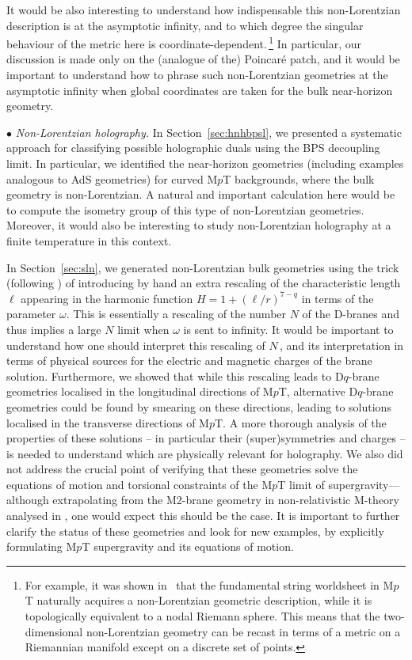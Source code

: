 \documentclass[11pt]{article}
\renewcommand{\emph}[1]{\textit{#1}}
\begin{document}
It would be also interesting to understand how indispensable this non-Lorentzian description is at the asymptotic infinity, and to which degree the singular behaviour of the metric here is coordinate-dependent.\,\footnote{For example, it was shown in~\cite{Gomis:2023eav} that the fundamental string worldsheet in M$p$T naturally acquires a non-Lorentzian geometric description, while it is topologically equivalent to a nodal Riemann sphere. This means that the two-dimensional non-Lorentzian geometry can be recast in terms of a metric on a Riemannian manifold except on a discrete set of points.} In particular, our discussion is made only on the (analogue of the) Poincar\'{e} patch, and it would be important to understand how to phrase such non-Lorentzian geometries at the asymptotic infinity when global coordinates are taken for the bulk near-horizon geometry.  


\vspace{3mm}
\noindent $\bullet$ 
\emph{Non-Lorentzian holography.} 
In Section~\ref{sec:hnhbpsl}, we presented a systematic approach for classifying possible holographic duals using the BPS decoupling limit. In particular, we identified the near-horizon geometries (including examples analogous to AdS geometries) for curved M$p$T backgrounds, where the bulk geometry is non-Lorentzian. A natural and important calculation here would be to compute the isometry group of this type of non-Lorentzian geometries. 
Moreover, it would also be interesting to study non-Lorentzian holography at a finite temperature in this context.  

In Section~\ref{sec:sln}, we generated non-Lorentzian bulk geometries using the trick (following \cite{Avila:2023aey,Lambert:2024uue,Lambert:2024yjk,Fontanella:2024rvn}) of introducing by hand an extra rescaling of the characteristic length $\ell$ appearing in the harmonic function $H=1+(\ell/r)^{7-q}$ in terms of the parameter $\omega$.
This is essentially a rescaling of the number $N$ of the D-branes and thus implies a large $N$ limit when $\omega$ is sent to infinity. It would be important to understand how one should interpret this rescaling of $N$\,, and its interpretation in terms of physical sources for the electric and magnetic charges of the brane solution. 
Furthermore, we showed that while this rescaling leads to D$q$-brane geometries localised in the longitudinal directions of M$p$T, alternative D$q$-brane geometries could be found by smearing on these directions, leading to solutions localised in the transverse directions of M$p$T.
A more thorough analysis of the properties of these solutions -- in particular their (super)symmetries and charges -- is needed to understand which are physically relevant for holography. 
We also did not address the crucial point of verifying that these geometries solve the equations of motion
and torsional constraints of the M$p$T limit of supergravity---although extrapolating from the M2-brane geometry in non-relativistic M-theory analysed in \cite{Lambert:2024uue, Bergshoeff:2024nin}, one would expect this should be the case. It is important to further clarify the status of these geometries and look for new examples, by explicitly formulating M$p$T supergravity and its equations of motion. 
\end{document}
